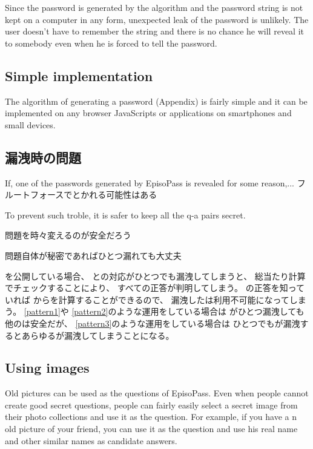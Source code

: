 \documentclass{article}
\begin{document}
Since the password is generated by the algorithm and the password
string is not kept on a computer in any form,
unexpected leak of the password is unlikely.
The user doesn't have to remember the string and
there is no chance he will reveal it to somebody
even when he is forced to tell the password.


\subsection{Simple implementation}

The algorithm of generating a password (Appendix)
is fairly simple and
it can be implemented on any browser JavaScripts or
applications on smartphones and small devices.

\subsection{{\PW}漏洩時の問題}

If, one of the passwords generated by EpisoPass is revealed
for some reason,... フルートフォースでとかれる可能性はある

To prevent such troble, it is safer to keep all the q-a pairs secret.

問題を時々変えるのが安全だろう

問題自体が秘密であればひとつ漏れても大丈夫

{\SQ}を公開している場合、
{\SS}と{\PW}の対応がひとつでも漏洩してしまうと、
総当たり計算でチェックすることにより、
すべて{\SQ}の正答が判明してしまう。
{\SQ}の正答を知っていれば
{\SS}から{\PW}を計算することができるので、
漏洩した{\SQ}は利用不可能になってしまう。
%
\ref{pattern1}や
\ref{pattern2}のような運用をしている場合は
{\PW}がひとつ漏洩しても他の{\PW}は安全だが、
\ref{pattern3}のような運用をしている場合は
ひとつでも{\PW}が漏洩するとあらゆる{\PW}が漏洩してしまうことになる。

\subsection{Using images}

Old pictures can be used as the questions of EpisoPass.
Even when people cannot create good secret questions,
people can fairly easily select a secret image from their photo collections
and use it as the question.
For example, if you have a n old picture of your friend,
you can use it as the question
and use his real name and other similar names as candidate answers.
\end{document}

